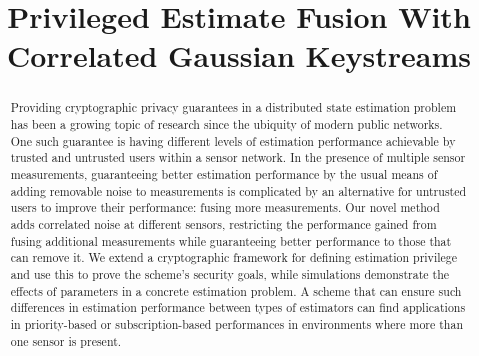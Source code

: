 \documentclass[conference]{IEEEtran}
\begin{document}
\title{Privileged Estimate Fusion With Correlated Gaussian Keystreams}

\author{
\and
{}
}

\maketitle

% 
%                                    
%                                    
%                                    
% 

\begin{abstract}
Providing cryptographic privacy guarantees in a distributed state estimation problem has been a growing topic of research since the ubiquity of modern public networks. One such guarantee is having different levels of estimation performance achievable by trusted and untrusted users within a sensor network. In the presence of multiple sensor measurements, guaranteeing better estimation performance by the usual means of adding removable noise to measurements is complicated by an alternative for untrusted users to improve their performance: fusing more measurements. Our novel method adds correlated noise at different sensors, restricting the performance gained from fusing additional measurements while guaranteeing better performance to those that can remove it. We extend a cryptographic framework for defining estimation privilege and use this to prove the scheme's security goals, while simulations demonstrate the effects of parameters in a concrete estimation problem. A scheme that can ensure such differences in estimation performance between types of estimators can find applications in priority-based or subscription-based performances in environments where more than one sensor is present.
\end{abstract}
\end{document}
